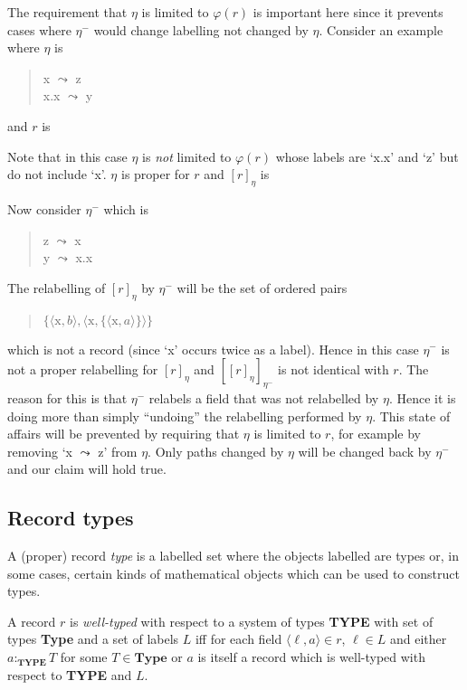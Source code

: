 The
requirement that $\eta$ is limited to $\varphi(r)$ is important here
since it prevents cases where $\eta^-$ would change labelling not
changed by $\eta$.  Consider an example where $\eta$ is 
\begin{quote}
x $\leadsto$ z\\
x.x $\leadsto$ y
\end{quote}
and $r$ is
\begin{quote}
\end{quote}
Note that in this case $\eta$ is \textit{not} limited to $\varphi(r)$ whose
labels are `x.x' and `z' but do not include `x'.  $\eta$ is
proper for $r$ and $[r]_\eta$ is
\begin{quote}
\end{quote}
Now consider $\eta^-$ which is
\begin{quote}
z $\leadsto$ x\\
y $\leadsto$ x.x
\end{quote}
The relabelling of $[r]_\eta$ by $\eta^-$ will be the set of ordered
pairs
\begin{quote}
$\{\langle\mathrm{x},b\rangle,\langle\mathrm{x},\{\langle\mathrm{x},a\rangle\}\rangle\}$
\end{quote}
which is not a record (since `x' occurs twice as a label).  Hence in
this case $\eta^-$ is not a proper relabelling for $[r]_\eta$ and
$[[r]_\eta]_{\eta^-}$ is not identical with $r$.  The reason for this
is that $\eta^-$ relabels a field that was not relabelled by $\eta$.
Hence it is doing more than simply ``undoing'' the relabelling
performed by $\eta$.  This state of affairs will be prevented by
requiring that $\eta$ is limited to $r$, for example by removing `x
$\leadsto$ z' from $\eta$.  Only paths changed by $\eta$ will be
changed back by $\eta^-$ and our claim will hold true.


\subsection{Record types}

A (proper) record \textit{type} is a labelled set 
where the objects labelled are types or, in some cases, certain
kinds of mathematical objects which can be used to construct types.

A record $r$ is \textit{well-typed} with respect to a system of types
\textbf{TYPE} with set of types \textbf{Type} and a set of labels $L$
iff for each field $\langle\ell,a\rangle\in r$, $\ell\in L$ and
either $a:_\mathbf{TYPE}T$ for some $T\in\mathbf{Type}$ or $a$ is
itself a record which is well-typed with respect to \textbf{TYPE} and $L$.

